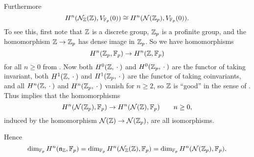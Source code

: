 Furthermore
\begin{equation*}
  H^{n}(\mathcal{N}_{\mathbb{Z}}(\mathbb{Z}),V_{\mathbb{F}_p}(0)) \cong H^{n}(\mathcal{N}(\mathbb{Z}_p),V_{\mathbb{F}_p}(0)).
\end{equation*}
To see this, first note that $\mathbb{Z}$ is a discrete group, $\mathbb{Z}_p$ is a profinite group, and the homomorphism $\mathbb{Z} \to \mathbb{Z}_p$ has dense image in $\mathbb{Z}_p$. So we have homomorphisms
\begin{equation*}
  H^n(\mathbb{Z}_p,\mathbb{F}_p) \to H^n(\mathbb{Z},\mathbb{F}_p)
\end{equation*}
for all $n\geq0$ from \cite[Section~I~§2.6]{GalCoh}. Now both $H^0(\mathbb{Z},\:\cdot\:)$ and $H^0(\mathbb{Z}_p,\:\cdot\:)$ are the functor of taking invariant, both $H^1(\mathbb{Z},\:\cdot\:)$ and $H^1(\mathbb{Z}_p,\:\cdot\:)$ are the functor of taking coinvariants, and all $H^n(\mathbb{Z},\:\cdot\:)$ and $H^n(\mathbb{Z}_p,\:\cdot\:)$ vanish for $n\geq2$, so $\mathbb{Z}$ is \enquote{good} in the sense of \cite[Section~I~§2.6 Exercise~2]{GalCoh}. Thus \cite[Section~I~§2.6 Exercise~2(d)]{GalCoh} implies that the homomorphisms
\begin{equation*}
  H^n(\mathcal{N}(\mathbb{Z}_p),\mathbb{F}_p) \to H^n(\mathcal{N}(\mathbb{Z}),\mathbb{F}_p) \qquad n\geq0,
\end{equation*}
induced by the homomorphism $\mathcal{N}(\mathbb{Z}) \to \mathcal{N}(\mathbb{Z}_p)$, are all isomorphisms.

Hence
\begin{equation*}
  \dim_{\mathbb{F}_p} H^{n}(\mathfrak{n}_{\mathbb{Z}},\mathbb{F}_p) = \dim_{\mathbb{F}_p} H^n(\mathcal{N}_{\mathbb{Z}}(\mathbb{Z}),\mathbb{F}_p)= \dim_{\mathbb{F}_p} H^{n}(\mathcal{N}(\mathbb{Z}_p),\mathbb{F}_p).
\end{equation*}


